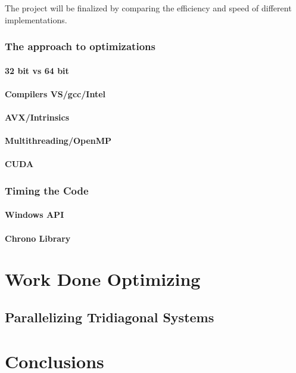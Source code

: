 \documentclass[12pt, oneside]{book}
\theoremstyle{plain}
\theoremstyle{definition}
\begin{document}
The project will be finalized by comparing the efficiency and speed of different implementations.


\subsection{The approach to optimizations}
\subsubsection{32 bit vs 64 bit}
\lipsum[5]
\subsubsection{Compilers VS/gcc/Intel}
\lipsum[5]
\subsubsection{AVX/Intrinsics}
\lipsum[5]
\subsubsection{Multithreading/OpenMP}
\lipsum[5]	
\subsubsection{CUDA}
\lipsum[5]	
\subsection{Timing the Code}
\subsubsection{Windows API}
\lipsum[5]
\subsubsection{Chrono Library}
\lipsum[5]

\chapter{Work Done Optimizing}

\section{Parallelizing Tridiagonal Systems}
\lipsum[5]



\chapter{Conclusions}
\lipsum[5]
\end{document}
